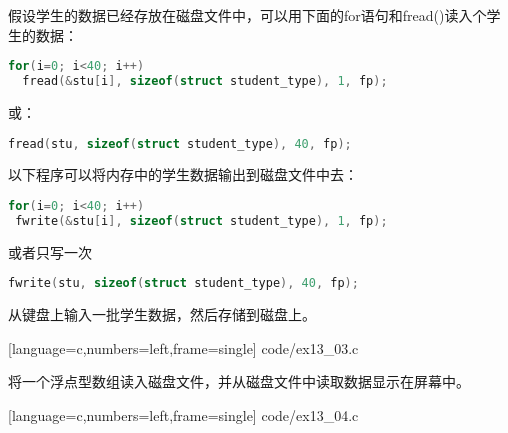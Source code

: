 \begin{frame}[fragile]
  假设学生的数据已经存放在磁盘文件中，可以用下面的{\tf for}语句和{\tf fread()}读入{}个学生的数据：
  \begin{lstlisting}[language=c,backgroundcolor=\color{red!20}]
for(i=0; i<40; i++)
  fread(&stu[i], sizeof(struct student_type), 1, fp);
  \end{lstlisting}
  或：
  \begin{lstlisting}[language=c,backgroundcolor=\color{red!20}]
fread(stu, sizeof(struct student_type), 40, fp);
  \end{lstlisting}
\end{frame}

\begin{frame}[fragile]
  以下程序可以将内存中的学生数据输出到磁盘文件中去：
  \begin{lstlisting}[language=c,backgroundcolor=\color{red!20}]
for(i=0; i<40; i++) 
 fwrite(&stu[i], sizeof(struct student_type), 1, fp);
  \end{lstlisting}
  或者只写一次
  \begin{lstlisting}[language=c,backgroundcolor=\color{red!20}]
fwrite(stu, sizeof(struct student_type), 40, fp);　
  \end{lstlisting}
\end{frame}

\begin{frame}[fragile]
  \begin{li}
    从键盘上输入一批学生数据，然后存储到磁盘上。
  \end{li}
\end{frame}


\begin{frame}
  
  [language=c,numbers=left,frame=single]
  {code/ex13_03.c}
\end{frame}


\begin{frame}[fragile]
  \begin{li}
    将一个浮点型数组读入磁盘文件，并从磁盘文件中读取数据显示在屏幕中。
  \end{li}
\end{frame}


\begin{frame}
  
  [language=c,numbers=left,frame=single]
  {code/ex13_04.c}
\end{frame}

